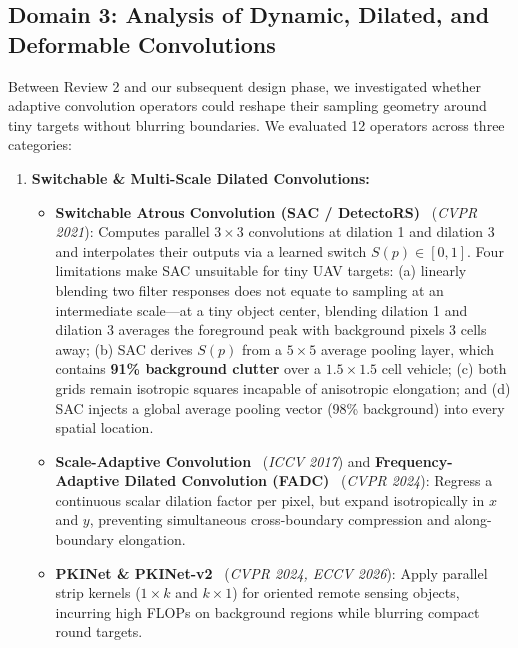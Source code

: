 \documentclass[11pt,a4paper]{article}
\begin{document}
\subsection{Domain 3: Analysis of Dynamic, Dilated, and Deformable Convolutions}

Between Review 2 and our subsequent design phase, we investigated whether adaptive convolution operators could reshape their sampling geometry around tiny targets without blurring boundaries. We evaluated 12 operators across three categories:

\begin{enumerate}[leftmargin=1.6em]
    \item \textbf{Switchable \& Multi-Scale Dilated Convolutions:}
    \begin{itemize}[leftmargin=1.2em]
        \item \textbf{Switchable Atrous Convolution (SAC / DetectoRS)}~\cite{qiao2021detectors} (\emph{CVPR 2021}): Computes parallel $3\times 3$ convolutions at dilation 1 and dilation 3 and interpolates their outputs via a learned switch $S(p) \in [0,1]$. Four limitations make SAC unsuitable for tiny UAV targets: (a) linearly blending two filter responses does not equate to sampling at an intermediate scale---at a tiny object center, blending dilation 1 and dilation 3 averages the foreground peak with background pixels 3 cells away; (b) SAC derives $S(p)$ from a $5\times 5$ average pooling layer, which contains \textbf{91\% background clutter} over a $1.5\times 1.5$ cell vehicle; (c) both grids remain isotropic squares incapable of anisotropic elongation; and (d) SAC injects a global average pooling vector (98\% background) into every spatial location.
        \item \textbf{Scale-Adaptive Convolution}~\cite{zhang2017sac} (\emph{ICCV 2017}) and \textbf{Frequency-Adaptive Dilated Convolution (FADC)}~\cite{chen2024fadc} (\emph{CVPR 2024}): Regress a continuous scalar dilation factor per pixel, but expand isotropically in $x$ and $y$, preventing simultaneous cross-boundary compression and along-boundary elongation.
        \item \textbf{PKINet \& PKINet-v2}~\cite{cai2024pkinet,cai2026pkinetv2} (\emph{CVPR 2024, ECCV 2026}): Apply parallel strip kernels ($1\times k$ and $k\times 1$) for oriented remote sensing objects, incurring high FLOPs on background regions while blurring compact round targets.
    \end{itemize}


\end{enumerate}
\end{document}
